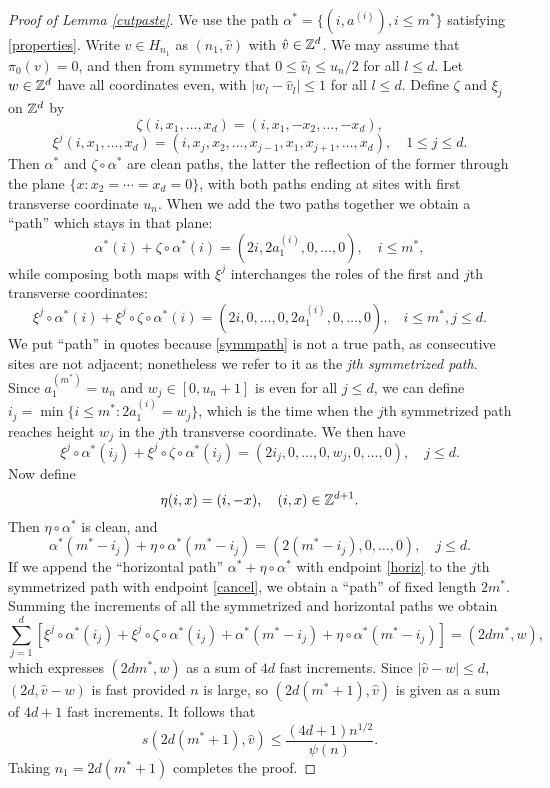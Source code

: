 \documentclass[12pt]{amsart}
\theoremstyle{plain}
\theoremstyle{definition}
\numberwithin{equation}{section}
\begin{document}
\begin{proof}[Proof of Lemma \ref{cutpaste}]
We use the path $\alpha^*= \{(i,a^{(i)}), i \leq m^*\}$ satisfying \eqref{properties}.  
Write $v \in H_{n_1}$ as $(n_1,\hat{v})$ with $\hat{v} \in \mathbb{Z}^d$.
We may assume that $\pi_0(v)=0$, and then from symmetry that $0 \leq \hat{v}_l \leq u_n/2$ for all $l \leq d$.
Let $w \in \mathbb{Z}^d$ have all coordinates even, with $|w_l - \hat{v}_l| \leq 1$ for all $l \leq d$.
Define $\zeta$ and $\xi_j$ on $\mathbb{Z}^d$ by
\[
  \zeta(i,x_1,\dots,x_d) = (i,x_1,-x_2,\dots,-x_d), 
  \]
\[
  \xi^j(i,x_1,\dots,x_d) = (i,x_j,x_2,\dots,x_{j-1},x_1,x_{j+1},\dots,x_d), \quad 1 \leq j \leq d.
  \]
Then $\alpha^*$ and $\zeta \circ \alpha^*$ are clean paths, the latter the reflection of the former through the plane $\{x:x_2=\cdots=x_d=0\}$, with both paths ending at sites with first transverse coordinate $u_n$.  When we add the two paths together we obtain a ``path'' which stays in that plane:
\[
  \alpha^*(i) + \zeta \circ \alpha^*(i) = (2i,2a_1^{(i)},0,\dots,0),  \quad i \leq m^*,
  \]
while composing both maps with $\xi^j$ interchanges the roles of the first and $j$th transverse coordinates:
\begin{equation} \label{symmpath}
  \xi^j \circ \alpha^*(i) + \xi^j \circ \zeta \circ \alpha^*(i) = (2i,0,\dots,0,2a_1^{(i)},0,\dots,0),  \quad i \leq m^*, j \leq d.
  \end{equation}
We put ``path'' in quotes because \eqref{symmpath} is not a true path, as consecutive sites are not adjacent; nonetheless we refer to it as the \emph{jth symmetrized path}.
Since $a_1^{(m^*)} = u_n$ and $w_j \in [0,u_n+1]$ is even for all $j \leq d$, we can define $i_j = \min\{i \leq m^*: 2a_1^{(i)} = w_j\}$, which is the time when the $j$th symmetrized path reaches height $w_j$ in the $j$th transverse coordinate.  We then have
\begin{equation} \label{cancel}
  \xi^j \circ \alpha^*(i_j) + \xi^j \circ \zeta \circ \alpha^*(i_j) = (2i_j,0,\dots,0,w_j,0,\dots,0),  \quad j \leq d.
  \end{equation}
Now define 
\[
  \eta(i,x) = (i,-x), \quad (i,x) \in \mathbb{Z}^{d+1}. 
  \]
Then $\eta \circ \alpha^*$ is clean, and 
\begin{equation} \label{horiz}
  \alpha^*(m^*-i_j) + \eta \circ \alpha^*(m^*-i_j) = (2(m^*-i_j),0,\dots,0),  \quad j \leq d.
  \end{equation}
If we append the ``horizontal path'' $\alpha^* + \eta \circ \alpha^*$ with endpoint \eqref{horiz} to the $j$th symmetrized path with endpoint \eqref{cancel}, we obtain a ``path'' of fixed length $2m^*$.  Summing the increments of all the symmetrized and horizontal paths we obtain
\[
  \sum_{j=1}^d \left[ \xi^j \circ \alpha^*(i_j) + \xi^j \circ \zeta \circ \alpha^*(i_j) + \alpha^*(m^*-i_j) + \eta \circ \alpha^*(m^*-i_j) \right]
    = (2dm^*,w),
  \]
which expresses $(2dm^*,w)$ as a sum of $4d$ fast increments.  Since $|\hat{v}-w| \leq d$, $(2d,\hat{v}-w)$ is fast provided $n$ is large, so $(2d(m^*+1),\hat{v})$ is given as a sum of $4d+1$ fast increments.  It follows that 
\[
  s(2d(m^*+1),\hat{v}) \leq \frac{(4d+1)n^{1/2}}{\psi(n)}.
  \]
Taking $n_1=2d(m^*+1)$ completes the proof.
\end{proof}
\end{document}
